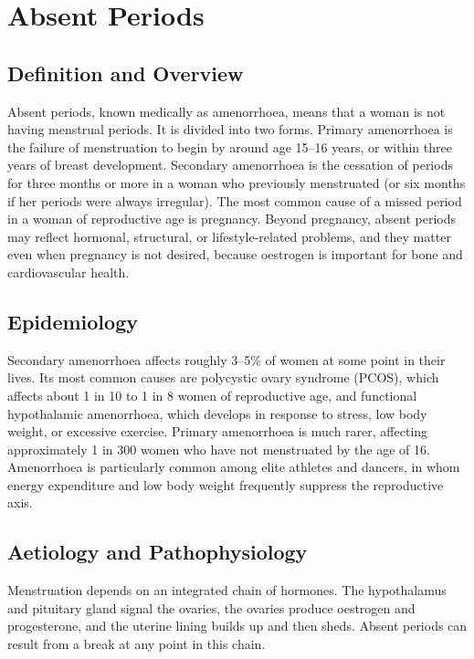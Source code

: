 \chapter{Absent Periods}

\section*{Definition and Overview}
Absent periods, known medically as amenorrhoea, means that a woman is not having menstrual periods. It is divided into two forms. Primary amenorrhoea is the failure of menstruation to begin by around age 15--16 years, or within three years of breast development. Secondary amenorrhoea is the cessation of periods for three months or more in a woman who previously menstruated (or six months if her periods were always irregular). The most common cause of a missed period in a woman of reproductive age is pregnancy. Beyond pregnancy, absent periods may reflect hormonal, structural, or lifestyle-related problems, and they matter even when pregnancy is not desired, because oestrogen is important for bone and cardiovascular health.

\section*{Epidemiology}
Secondary amenorrhoea affects roughly 3--5\% of women at some point in their lives. Its most common causes are polycystic ovary syndrome (PCOS), which affects about 1 in 10 to 1 in 8 women of reproductive age, and functional hypothalamic amenorrhoea, which develops in response to stress, low body weight, or excessive exercise. Primary amenorrhoea is much rarer, affecting approximately 1 in 300 women who have not menstruated by the age of 16. Amenorrhoea is particularly common among elite athletes and dancers, in whom energy expenditure and low body weight frequently suppress the reproductive axis.

\section*{Aetiology and Pathophysiology}
Menstruation depends on an integrated chain of hormones. The hypothalamus and pituitary gland signal the ovaries, the ovaries produce oestrogen and progesterone, and the uterine lining builds up and then sheds. Absent periods can result from a break at any point in this chain.

